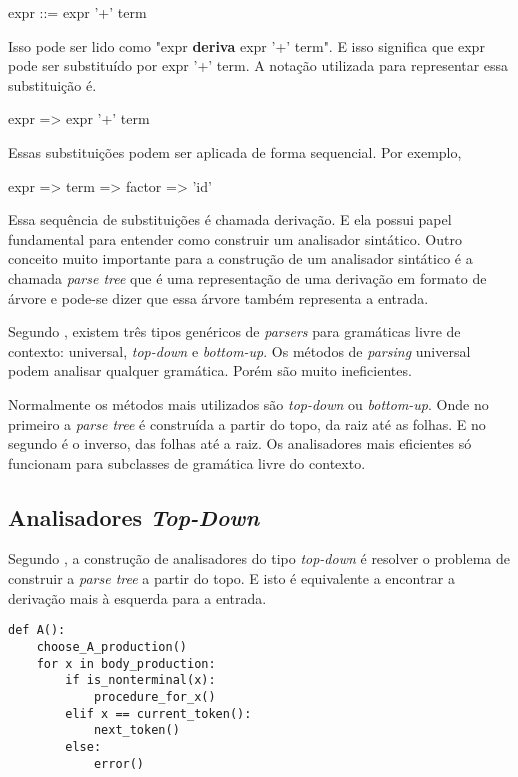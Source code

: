 \begin{center}
expr ::= expr '+' term
\end{center}

Isso pode ser lido como "expr \textbf{deriva} expr '+' term". E isso significa que expr pode
ser substituído por expr '+' term. A notação utilizada para representar essa substituição é.

\begin{center}
expr => expr '+' term
\end{center}

Essas substituições podem ser aplicada de forma sequencial. Por exemplo,

\begin{center}
    expr => term => factor => 'id'
\end{center}

Essa sequência de substituições é chamada derivação. E ela possui papel fundamental para entender
como construir um analisador sintático. Outro conceito muito importante para a construção de 
um analisador sintático é a chamada \textit{parse tree} que é uma representação de uma derivação em formato
de árvore e pode-se dizer que essa árvore também representa a entrada.

Segundo \cite{aho2006}, existem três tipos genéricos de \textit{parsers} para gramáticas 
livre de contexto: universal, \textit{top-down} e \textit{bottom-up}. Os métodos de \textit{parsing}
universal podem analisar qualquer gramática. Porém são muito ineficientes.

Normalmente os métodos mais utilizados são  \textit{top-down} ou \textit{bottom-up}. Onde no primeiro
a \textit{parse tree} é construída a partir do topo, da raiz até as folhas. E no segundo é o inverso,
das folhas até a raiz. Os analisadores mais eficientes só funcionam para subclasses de gramática livre
do contexto.

\subsection{Analisadores \textit{Top-Down}}

Segundo \cite{aho2006}, a construção de analisadores do tipo \textit{top-down} é
resolver o problema de construir a \textit{parse tree} a partir do topo. E isto é
equivalente a encontrar a derivação mais à esquerda para a entrada.

\begin{lstlisting}[caption=Exemplo de procedimento para um não terminal dentro de um parser,label={lst:recursive}]
def A():
    choose_A_production()
    for x in body_production:
        if is_nonterminal(x):
            procedure_for_x()
        elif x == current_token():
            next_token()
        else:
            error()
\end{lstlisting}

